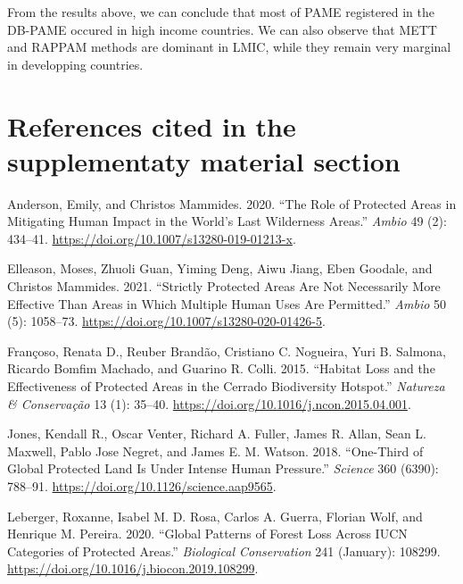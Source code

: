 \documentclass[
  letterpaper,
  DIV=11,
  numbers=noendperiod]{scrartcl}
\newlength{\cslhangindent}
\newlength{\cslentryspacingunit} %
\newenvironment{CSLReferences}[2] %
 {%
  \setlength{\parindent}{0pt}
  \ifodd #1
  \let\oldpar\par
  \def\par{\hangindent=\cslhangindent\oldpar}
  \fi
  \setlength{\parskip}{#2\cslentryspacingunit}
 }%
 {}
\begin{document}
From the results above, we can conclude that most of PAME registered in
the DB-PAME occured in high income countries. We can also observe that
METT and RAPPAM methods are dominant in LMIC, while they remain very
marginal in developping countries.

\hypertarget{references-cited-in-the-supplementaty-material-section}{%
\section*{References cited in the supplementaty material
section}\label{references-cited-in-the-supplementaty-material-section}}

\hypertarget{refs}{}
\begin{CSLReferences}{1}{0}
\leavevmode{}%
Anderson, Emily, and Christos Mammides. 2020. {``The Role of Protected
Areas in Mitigating Human Impact in the World{'}s Last Wilderness
Areas.''} \emph{Ambio} 49 (2): 434--41.
\url{https://doi.org/10.1007/s13280-019-01213-x}.

\leavevmode{}%
Elleason, Moses, Zhuoli Guan, Yiming Deng, Aiwu Jiang, Eben Goodale, and
Christos Mammides. 2021. {``Strictly Protected Areas Are Not Necessarily
More Effective Than Areas in Which Multiple Human Uses Are Permitted.''}
\emph{Ambio} 50 (5): 1058--73.
\url{https://doi.org/10.1007/s13280-020-01426-5}.

\leavevmode{}%
Françoso, Renata D., Reuber Brandão, Cristiano C. Nogueira, Yuri B.
Salmona, Ricardo Bomfim Machado, and Guarino R. Colli. 2015. {``Habitat
Loss and the Effectiveness of Protected Areas in the Cerrado
Biodiversity Hotspot.''} \emph{Natureza \& Conservação} 13 (1): 35--40.
\url{https://doi.org/10.1016/j.ncon.2015.04.001}.

\leavevmode{}%
Jones, Kendall R., Oscar Venter, Richard A. Fuller, James R. Allan, Sean
L. Maxwell, Pablo Jose Negret, and James E. M. Watson. 2018.
{``One-Third of Global Protected Land Is Under Intense Human
Pressure.''} \emph{Science} 360 (6390): 788--91.
\url{https://doi.org/10.1126/science.aap9565}.

\leavevmode{}%
Leberger, Roxanne, Isabel M. D. Rosa, Carlos A. Guerra, Florian Wolf,
and Henrique M. Pereira. 2020. {``Global Patterns of Forest Loss Across
IUCN Categories of Protected Areas.''} \emph{Biological Conservation}
241 (January): 108299.
\url{https://doi.org/10.1016/j.biocon.2019.108299}.


\end{CSLReferences}
\end{document}
